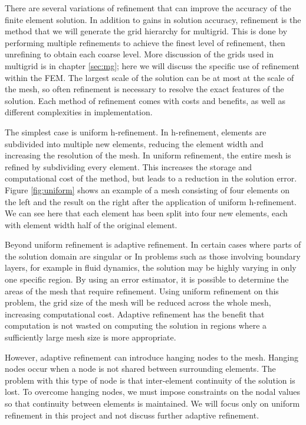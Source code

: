 \iffalse
How are the meshes created?
What is the process of refinement?
	Adaptive vs uniform
Hanging nodes..
p-refinement: order of the elements
h-refinement: density/size of the mesh
Use this to generate the grids for Multigrid
\fi

There are several variations of refinement that can improve the accuracy of the finite element solution.
In addition to gains in solution accuracy, refinement is the method that we will generate the grid hierarchy for multigrid.
This is done by performing multiple refinements to achieve the finest level of refinement, then unrefining to obtain each coarse level.
More discussion of the grids used in multigrid is in chapter \ref{sec:mg}; here we will discuss the specific use of refinement within the FEM.
The largest scale of the solution can be at most at the scale of the mesh, so often refinement is necessary to resolve the exact features of the solution.
Each method of refinement comes with costs and benefits, as well as different complexities in implementation.

The simplest case is uniform h-refinement.
In h-refinement, elements are subdivided into multiple new elements, reducing the element width and increasing the resolution of the mesh.
In uniform refinement, the entire mesh is refined by subdividing every element.
This increases the storage and computational cost of the method, but leads to a reduction in the solution error.
Figure \ref{fig:uniform} shows an example of a mesh consisting of four elements on the left and the result on the right after the application of uniform h-refinement.
We can see here that each element has been split into four new elements, each with element width half of the original element.

Beyond uniform refinement is adaptive refinement.
In certain cases where parts of the solution domain are singular or
In problems such as those involving boundary layers, for example in fluid dynamics, the solution may be highly varying in only one specific region.
By using an error estimator, it is possible to determine the areas of the mesh that require refinement.
Using uniform refinement on this problem, the grid size of the mesh will be reduced across the whole mesh, increasing computational cost.
Adaptive refinement has the benefit that computation is not wasted on computing the solution in regions where a sufficiently large mesh size is more appropriate.

However, adaptive refinement can introduce hanging nodes to the mesh.
Hanging nodes occur when a node is not shared between surrounding elements.
The problem with this type of node is that inter-element continuity of the solution is lost.
To overcome hanging nodes, we must impose constraints on the nodal values so that continuity between elements is maintained.
We will focus only on uniform refinement in this project and not discuss further adaptive refinement.

